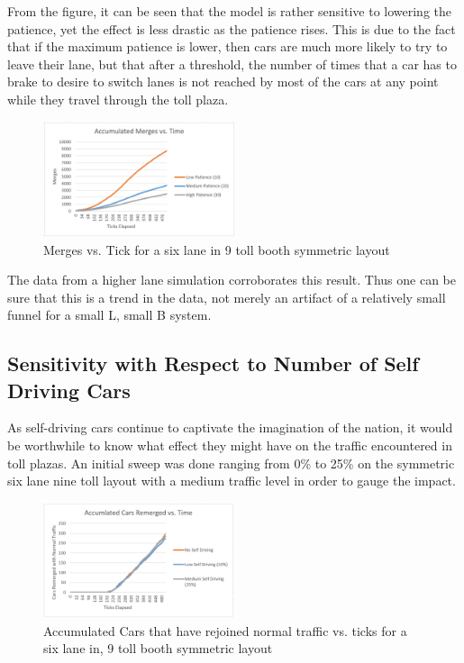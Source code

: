 \documentclass{article}
\begin{document}
From the figure, it can be seen that the model is rather sensitive to lowering the patience, yet the effect is less drastic as the patience rises. This is due to the fact that if the maximum patience is lower, then cars are much more likely to try to leave their lane, but that after a threshold, the number of times that a car has to brake to desire to switch lanes is not reached by most of the cars at any point while they travel through the toll plaza.

\begin{figure}[H]
    \centering
    \includegraphics[width=0.5\textwidth]{patienceSA2.PNG}
    \caption[width=0.8\textwidth]{Merges vs. Tick for a six lane in 9 toll booth symmetric layout}
\end{figure}

The data from a higher lane simulation corroborates this result. Thus one can be sure that this is a trend in the data, not merely an artifact of a relatively small funnel for a small L, small B system.

\subsection{Sensitivity with Respect to Number of Self Driving Cars}
As self-driving cars continue to captivate the imagination of the nation, it would be worthwhile to know what effect they might have on the traffic encountered in toll plazas. An initial sweep was done ranging from 0\% to 25\% on the symmetric six lane nine toll layout with a medium traffic level in order to gauge the impact.

\begin{figure}[H]
    \centering
    \includegraphics[width=0.5\textwidth]{SDSA.PNG}
    \caption[width=0.8\textwidth]{Accumulated Cars that have rejoined normal traffic vs. ticks for a six lane in, 9 toll booth symmetric layout}
\end{figure}
\end{document}
